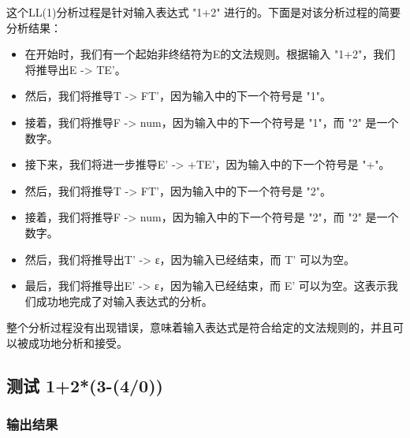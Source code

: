 \documentclass[lang=cn,11pt,a4paper]{elegantpaper}
\begin{document}
这个LL(1)分析过程是针对输入表达式 "1+2" 进行的。下面是对该分析过程的简要分析结果：
\begin{itemize}
    \item 在开始时，我们有一个起始非终结符为E的文法规则。根据输入 "1+2"，我们将推导出E -> TE'。
    \item 然后，我们将推导T -> FT'，因为输入中的下一个符号是 "1"。
    \item 接着，我们将推导F -> num，因为输入中的下一个符号是 "1"，而 "2" 是一个数字。
    \item 接下来，我们将进一步推导E' -> +TE'，因为输入中的下一个符号是 "+"。
    \item 然后，我们将推导T -> FT'，因为输入中的下一个符号是 "2"。
    \item 接着，我们将推导F -> num，因为输入中的下一个符号是 "2"，而 "2" 是一个数字。
    \item 然后，我们将推导出T' -> ε，因为输入已经结束，而 T' 可以为空。
    \item 最后，我们将推导出E' -> ε，因为输入已经结束，而 E' 可以为空。这表示我们成功地完成了对输入表达式的分析。
\end{itemize}

整个分析过程没有出现错误，意味着输入表达式是符合给定的文法规则的，并且可以被成功地分析和接受。

\subsection{测试 1+2*(3-(4/0))}

\subsubsection{输出结果}
\end{document}
